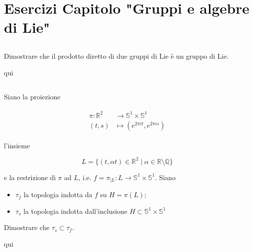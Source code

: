 \chapter{Esercizi Capitolo "Gruppi e algebre di Lie"}

\tocless\section{}\label{es3-1}

\begin{tcolorbox}
	Dimostrare che il prodotto diretto di due gruppi di Lie è un gruppo di Lie.
\end{tcolorbox}

qui

\tocless\section{}\label{es3-2}

\begin{tcolorbox}
	Siano la proiezione
	
	\begin{align}
		\begin{split}
			\pi : \mathbb{R}^{2} &\to \mathbb{S}^{1} \times \mathbb{S}^{1}\\
			(t,s) &\mapsto (e^{2 \pi i t},e^{2 \pi i s})
		\end{split}
	\end{align}

	l'insieme
	
	\begin{equation}
		L = \{ (t,\alpha t) \in \mathbb{R}^{2} \mid \alpha \in \mathbb{R} \setminus \mathbb{Q} \}
	\end{equation}

	e la restrizione di $ \pi $ ad $ L $, i.e. $ f = \pi_{|L} : L \to \mathbb{S}^{1} \times \mathbb{S}^{1} $. Siano
	
	\begin{itemize}
		\item $ \tau_{f} $ la topologia indotta da $ f $ su $ H = \pi(L) $;
		
		\item $ \tau_{s} $ la topologia indotta dall'inclusione $ H \subset \mathbb{S}^{1} \times \mathbb{S}^{1} $
	\end{itemize}

	Dimostrare che $ \tau_{s} \subset \tau_{f} $.
\end{tcolorbox}

qui

